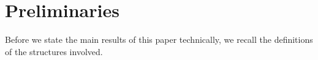 \documentclass[10pt,conference]{IEEEtran}
\theoremstyle{definition}
\begin{document}



\section{Preliminaries}
Before we state the main results of this paper technically,
    we recall the definitions of the structures involved.
\end{document}
